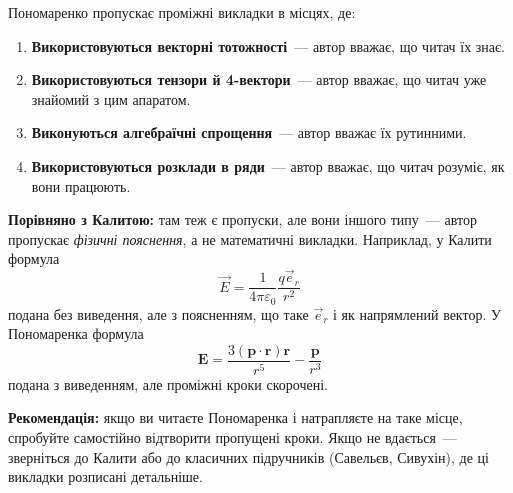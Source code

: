 \documentclass[11pt,a4paper]{article}
\begin{document}
Пономаренко пропускає проміжні викладки в місцях, де:
\begin{enumerate}[nosep]
    \item \textbf{Використовуються векторні тотожності}~--- автор вважає, що читач їх знає.
    \item \textbf{Використовуються тензори й 4-вектори}~--- автор вважає, що читач уже знайомий з цим апаратом.
    \item \textbf{Виконуються алгебраїчні спрощення}~--- автор вважає їх рутинними.
    \item \textbf{Використовуються розклади в ряди}~--- автор вважає, що читач розуміє, як вони працюють.
\end{enumerate}

\textbf{Порівняно з Калитою:} там теж є пропуски, але вони іншого типу~--- автор пропускає \emph{фізичні пояснення}, а не математичні викладки. Наприклад, у Калити формула
\[
\vec{E} = \frac{1}{4\pi\varepsilon_0} \frac{q\vec{e}_r}{r^2}
\]
подана без виведення, але з поясненням, що таке \(\vec{e}_r\) і як напрямлений вектор. У Пономаренка формула
\[
\mathbf{E} = \frac{3(\mathbf{p} \cdot \mathbf{r})\mathbf{r}}{r^5} - \frac{\mathbf{p}}{r^3}
\]
подана з виведенням, але проміжні кроки скорочені.

\textbf{Рекомендація:} якщо ви читаєте Пономаренка і натрапляєте на таке місце, спробуйте самостійно відтворити пропущені кроки. Якщо не вдається~--- зверніться до Калити або до класичних підручників (Савельєв, Сивухін), де ці викладки розписані детальніше.
\end{document}
